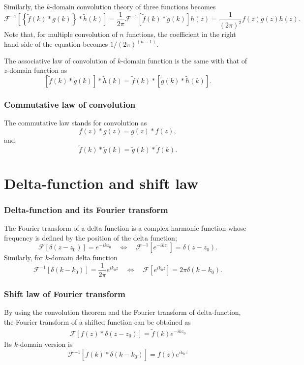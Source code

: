 \documentclass{article}[10pt,a4paper]
\newcommand{\ft}[1]{\mathcal{F}\left[{#1}\right]\xspace}
\newcommand{\ift}[1]{\mathcal{F}^{-1}\left[{#1}\right]\xspace}
\newcommand{\sexp}[1]{e^{#1}\xspace}
\begin{document}
Similarly, the $k$-domain convolution theory of three functions becomes
\begin{equation}
 \ift{\left\{\tilde{f}(k) * \tilde{g}(k) \right\}*\tilde{h}(k)} 
  = \frac{1}{2\pi}\ift{\tilde{f}(k)* \tilde{g}(k)} {h}(z) 
  = \frac{1}{(2\pi)^2} f(z) g(z) h(z).
\end{equation}
Note that, for multiple convolution of $n$ functions, the coefficient in
the right hand side of the equation becomes $1/(2 \pi)^{(n-1)}$.

The associative law of convolution of $k$-domain function is the same
with that of $z$-domain function as
\begin{equation}
 \left[\tilde{f}(k)*\tilde{g}(k)\right]*\tilde{h}(k) =
  \tilde{f}(k)*\left[\tilde{g}(k)*\tilde{h}(k)\right].
\end{equation}

\subsubsection*{Commutative law of convolution}
The commutative law stands for convolution as
\begin{equation}
 f(z)*g(z) = g(z) * f(z),
\end{equation}
and 
\begin{equation}
 \tilde{f}(k)* \tilde{g}(k) = \tilde{g}(k)* \tilde{f}(k).
\end{equation}

\section{Delta-function and shift law}
\subsubsection*{Delta-function and its Fourier transform}
The Fourier transform of a delta-function is a complex harmonic
function whose frequency is defined by the position of the delta
function;
\begin{equation}
 \ft{\delta(z-z_0)} = \sexp{-i k z_0}
  \quad \Leftrightarrow \quad
  \ift{\sexp{-ikz_0}} = \delta(z-z_0).
\end{equation}
Similarly, for $k$-domain delta function
\begin{equation}
 \ift{\delta(k-k_0)} = \frac{1}{2\pi} \sexp{i k_0 z}
  \quad \Leftrightarrow \quad
  \ft{\sexp{ik_0 z}} = 2\pi \delta(k-k_0).
\end{equation}

\subsubsection*{Shift law of Fourier transform}
By using the convolution theorem and the Fourier transform of
delta-function, the Fourier transform of a shifted function can be
obtained as
\begin{eqnarray}
 \ft{ f(z) * \delta(z-z_0)} = \tilde{f}(k) \sexp{-ikz_0}
\end{eqnarray}
Its $k$-domain version is
\begin{equation}
 \ift{\tilde{f}(k) * \delta(k-k_0)} = f(z) \sexp{ik_0 z}
\end{equation}
\end{document}
